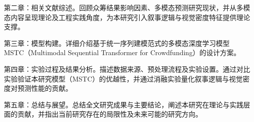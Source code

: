 第二章：相关文献综述。回顾众筹结果影响因素、多模态预测研究现状，并从多模态内容呈现理论及工程实践角度，为本研究引入叙事逻辑与视觉密度特征提供理论支撑。

第三章：模型构建。详细介绍基于统一序列建模范式的多模态深度学习模型 MSTC（Multimodal Sequential Transformer for Crowdfunding）的设计方案。

第四章：实验过程及结果分析。描述数据来源、预处理流程及实验设置。通过对比实验验证本研究模型（MSTC）的优越性，并通过消融实验量化叙事逻辑与视觉密度对预测性能的贡献。

第五章：总结与展望。总结全文研究成果与主要结论，阐述本研究在理论与实践层面的贡献，并指出当前研究存在的局限性及未来可能的研究方向。
